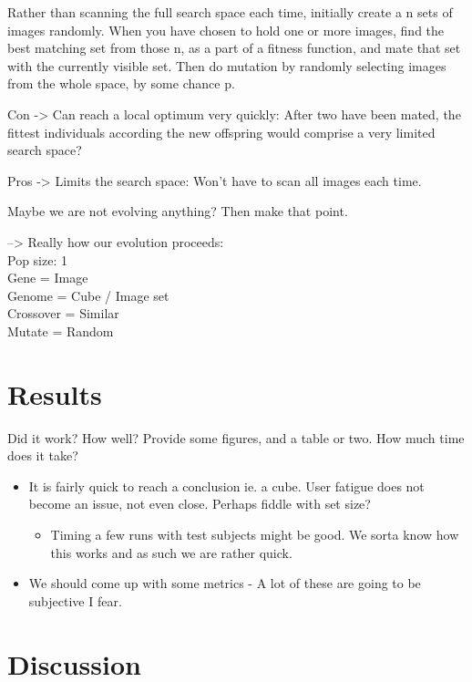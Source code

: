 \documentclass[]{article}
\begin{document}
Rather than scanning the full search space each time, initially create a n sets of images randomly.  When you have chosen to hold one or more images, find the best matching set from those n, as a part of a fitness function, and mate that set with the currently visible set.  Then do mutation by randomly selecting images from the whole space, by some chance p.


Con ->  Can reach a local optimum very quickly:  After two have been mated, the fittest individuals according the new offspring would comprise a very limited search space?

Pros ->  Limits the search space:  Won’t have to scan all images each time.

Maybe we are not evolving anything?  Then make that point.

--> Really how our evolution proceeds:\\
Pop size: 1\\
Gene = Image\\
Genome = Cube / Image set\\
Crossover = Similar\\
Mutate = Random

\section{Results}
\label{sec:Results}
\begin{framed}
Did it work? How well? Provide some figures, and a table or two. How much time does it take?
\end{framed}
\begin{itemize}		
\item It is fairly quick to reach a conclusion ie. a cube. User fatigue does not become an issue, not even close. Perhaps fiddle with set size?
	\begin{itemize}
	\item Timing a few runs with test subjects might be good. We sorta know how this works and as such we are rather quick.
	\end{itemize}
\item We should come up with some metrics - A lot of these are going to be subjective I fear.
\end{itemize}



\section{Discussion}
\label{sec:Discussion}
\end{document}
